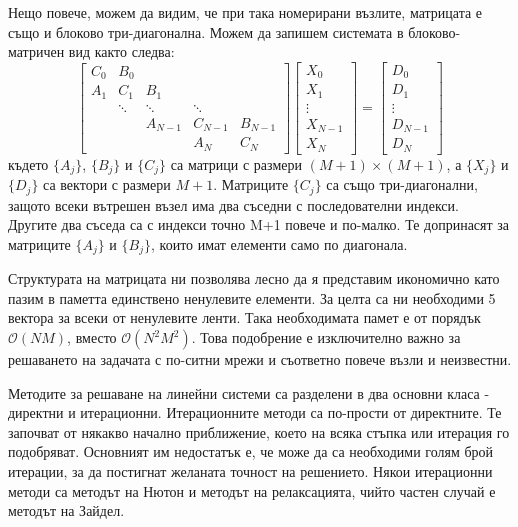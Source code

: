 \documentclass[12pt]{article}
\numberwithin{equation}{section}
\begin{document}
Нещо повече, можем да видим, че при така номерирани възлите, матрицата е също и блоково три-диагонална. Можем да запишем системата в блоково-матричен вид както следва:
\medskip
\begin{equation}
    \label{f:block-tridiagonal}
    \left[
    \begin{array}{cccccc}
        C_0 & B_0    &         &         & \\
        A_1 & C_1    & B_1     &         & \\
            & \ddots & \ddots  & \ddots  & \\
            &        & A_{N-1} & C_{N-1} & B_{N-1} \\
            &        &         & A_N     & C_N
    \end{array}
    \right]
    \left[
    \begin{array}{c}
        X_0 \\ X_1 \\ \vdots \\ X_{N-1} \\ X_N
    \end{array}
    \right]
    = \left[
    \begin{array}{c}
        D_0 \\ D_1 \\ \vdots \\ D_{N-1} \\ D_N
    \end{array}
    \right]
\end{equation}
\medskip
където $\{A_j\}$, $\{B_j\}$ и $\{C_j\}$ са матрици с размери $(M+1)\times(M+1)$, а $\{X_j\}$ и $\{D_j\}$
са вектори с размери $M+1$. Матриците $\{C_j\}$ са също три-диагонални, защото всеки вътрешен възел има два съседни с последователни индекси. Другите два съседа са с индекси точно M+1 повече и по-малко. Те допринасят за матриците $\{A_j\}$ и $\{B_j\}$, които имат елементи само по диагонала.

Структурата на матрицата ни позволява лесно да я представим икономично като пазим в паметта единствено ненулевите елементи. За целта са ни необходими 5 вектора за всеки от ненулевите ленти. Така необходимата памет е от порядък $\mathcal{O}(N M)$, вместо $\mathcal{O}(N^2 M^2)$. Това подобрение е изключително важно за решаването на задачата с по-ситни мрежи и съответно повече възли и неизвестни.

Методите за решаване на линейни системи са разделени в два основни класа - директни и итерационни. Итерационните методи са по-прости от директните. Те започват от някакво начално приближение, което на всяка стъпка или итерация го подобряват. Основният им недостатък е, че може да са необходими голям брой итерации, за да постигнат желаната точност на решението. Някои итерационни методи са методът на Нютон и методът на релаксацията, чийто частен случай е методът на Зайдел\cite{linear-system-iterative-methods}.
\end{document}
